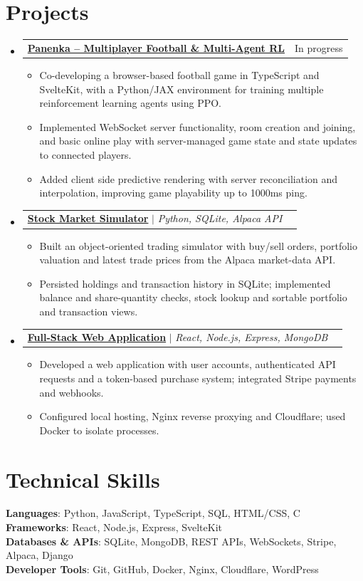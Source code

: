 \documentclass[letterpaper,11pt]{article}
\makeatletter
\newcommand{\resumeItem}[1]{\item\small{{#1\vspace{-2pt}}}}
\newcommand{\resumeProjectHeading}[2]{
  \item\begin{tabular*}{0.97\textwidth}{l@{\extracolsep{\fill}}r}
    \small#1 & \small#2 \\
  \end{tabular*}\vspace{-7pt}}
\newcommand{\resumeSubHeadingListStart}{\begin{itemize}[leftmargin=0.15in,label={}]}
\newcommand{\resumeSubHeadingListEnd}{\end{itemize}}
\newcommand{\resumeItemListStart}{\begin{itemize}}
\newcommand{\resumeItemListEnd}{\end{itemize}\vspace{-5pt}}
\makeatother
\begin{document}
\section{Projects}
\resumeSubHeadingListStart
  \resumeProjectHeading{\textbf{\href{https://github.com/CooperMcCloskey/Panenka}{Panenka -- Multiplayer Football \& Multi-Agent RL}}}{In progress}
  \resumeItemListStart
    \resumeItem{Co-developing a browser-based football game in TypeScript and SvelteKit, with a Python/JAX environment for training multiple reinforcement learning agents using PPO.}
    \resumeItem{Implemented WebSocket server functionality, room creation and joining, and basic online play with server-managed game state and state updates to connected players.}
    \resumeItem{Added client side predictive rendering with server reconciliation and interpolation, improving game playability up to 1000ms ping.}
  \resumeItemListEnd
  \resumeProjectHeading{\textbf{\href{https://github.com/michaelrmo/stockmarketSim}{Stock Market Simulator}} $|$ \emph{Python, SQLite, Alpaca API}}{}
  \resumeItemListStart
    \resumeItem{Built an object-oriented trading simulator with buy/sell orders, portfolio valuation and latest trade prices from the Alpaca market-data API.}
    \resumeItem{Persisted holdings and transaction history in SQLite; implemented balance and share-quantity checks, stock lookup and sortable portfolio and transaction views.}
  \resumeItemListEnd
  \resumeProjectHeading{\textbf{\href{https://github.com/michaelrmo/dofeFullStack}{Full-Stack Web Application}} $|$ \emph{React, Node.js, Express, MongoDB}}{}
  \resumeItemListStart
    \resumeItem{Developed a web application with user accounts, authenticated API requests and a token-based purchase system; integrated Stripe payments and webhooks.}
    \resumeItem{Configured local hosting, Nginx reverse proxying and Cloudflare; used Docker to isolate processes.}
  \resumeItemListEnd
\resumeSubHeadingListEnd

\section{Technical Skills}
\begin{itemize}[leftmargin=0.15in,label={}]
  \small{\item{
    \textbf{Languages}{: Python, JavaScript, TypeScript, SQL, HTML/CSS, C} \\
    \textbf{Frameworks}{: React, Node.js, Express, SvelteKit} \\
    \textbf{Databases \& APIs}{: SQLite, MongoDB, REST APIs, WebSockets, Stripe, Alpaca, Django} \\
    \textbf{Developer Tools}{: Git, GitHub, Docker, Nginx, Cloudflare, WordPress}
  }}
\end{itemize}
\end{document}
